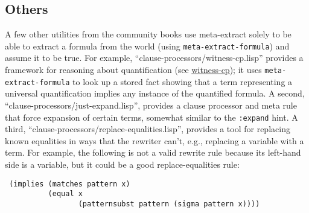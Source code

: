 \subsection{Others}

A few other utilities from the community books use
meta-extract solely to be able to extract a formula from the world
(using \texttt{meta-extract-formula}) and assume it to be true.  For
example, ``clause-processors/witness-cp.lisp'' provides a framework
for reasoning about quantification (see
\href{http://www.cs.utexas.edu/users/moore/acl2/manuals/current/manual/index.html?topic=ACL2\_\_\_\_WITNESS-CP}{\underline{witness-cp}});
it uses \texttt{meta-extract-formula} to look up a stored fact showing
that a term representing a universal quantification implies any
instance of the quantified formula.  A second,
``clause-processors/just-expand.lisp'', provides a clause processor
and meta rule that force expansion of certain terms, somewhat similar
to the \texttt{:expand} hint.  A third,
``clause-processors/replace-equalities.lisp'', provides a tool for
replacing known equalities in ways that the
rewriter can't, e.g., replacing a variable with a term.  For example, the
following is not a valid rewrite rule because its left-hand side is a
variable, but it could be a good replace-equalities rule:
\begin{verbatim}
 (implies (matches pattern x)
          (equal x
                 (patternsubst pattern (sigma pattern x))))
\end{verbatim}

\begin{comment}
[Matt] Above, ``subsitute'' looks like a typo.

[Sol] Yes, I appear to have misspelled it in a few places.  I mostly
meant the form above to be evocative rather than an actual example of
anything; I've changed it for now to use fewer functions that exist,
but if you prefer we could make it a real example that exists in the
books somewhere.
\end{comment}
